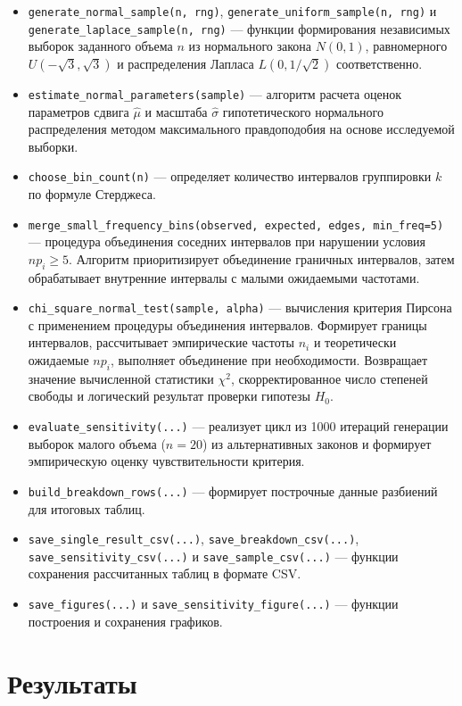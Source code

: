 \documentclass[a4paper, 14pt]{extarticle}
\begin{document}
\begin{itemize}
    \item \texttt{generate\_normal\_sample(n, rng)}, \texttt{generate\_uniform\_sample(n, rng)} и \texttt{generate\_laplace\_sample(n, rng)} --- функции формирования независимых выборок заданного объема $n$ из нормального закона $N(0, 1)$, равномерного $U(-\sqrt{3}, \sqrt{3})$ и распределения Лапласа $L(0, 1/\sqrt{2})$ соответственно.
    \item \texttt{estimate\_normal\_parameters(sample)} --- алгоритм расчета оценок параметров сдвига $\hat{\mu}$ и масштаба $\hat{\sigma}$ гипотетического нормального распределения методом максимального правдоподобия на основе исследуемой выборки.
    \item \texttt{choose\_bin\_count(n)} --- определяет количество интервалов группировки $k$ по формуле Стерджеса.
    \item \texttt{merge\_small\_frequency\_bins(observed, expected, edges, min\_freq=5)} --- процедура объединения соседних интервалов при нарушении условия $np_i \ge 5$. Алгоритм приоритизирует объединение граничных интервалов, затем обрабатывает внутренние интервалы с малыми ожидаемыми частотами.
    \item \texttt{chi\_square\_normal\_test(sample, alpha)} --- вычисления критерия Пирсона с применением процедуры объединения интервалов. Формирует границы интервалов, рассчитывает эмпирические частоты $n_i$ и теоретически ожидаемые $np_i$, выполняет объединение при необходимости. Возвращает значение вычисленной статистики $\chi^2$, скорректированное число степеней свободы и логический результат проверки гипотезы $H_0$.
    \item \texttt{evaluate\_sensitivity(...)} --- реализует цикл из 1000 итераций генерации выборок малого объема ($n=20$) из альтернативных законов и формирует эмпирическую оценку чувствительности критерия.
    \item \texttt{build\_breakdown\_rows(...)} --- формирует построчные данные разбиений для итоговых таблиц.
    \item \texttt{save\_single\_result\_csv(...)}, \texttt{save\_breakdown\_csv(...)}, \texttt{save\_sensitivity\_csv(...)} и \texttt{save\_sample\_csv(...)} --- функции сохранения рассчитанных таблиц в формате CSV.
    \item \texttt{save\_figures(...)} и \texttt{save\_sensitivity\_figure(...)} --- функции построения и сохранения графиков.
\end{itemize}

\section{Результаты}
\end{document}

